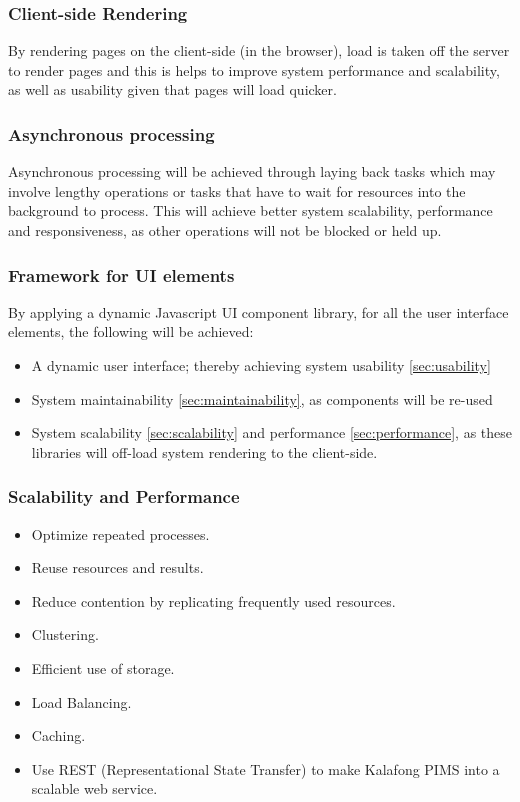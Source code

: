 \subsubsection{Client-side Rendering}
By rendering pages on the client-side (in the browser), load is taken off the server to render pages and this is helps to improve system performance and scalability, as well as usability given that pages will load quicker.


\subsubsection{Asynchronous processing}
Asynchronous processing will be achieved through laying back tasks which may involve lengthy operations or tasks that have to wait for resources into the background to process. This will achieve better system scalability, performance and responsiveness, as other operations will not be blocked or held up.


\subsubsection{Framework for UI elements}
By applying a dynamic Javascript UI component library, for all the user interface elements, the following will be achieved:
\begin{itemize}
		\item A dynamic user interface; thereby achieving system usability \ref{sec:usability}
		\item System maintainability  \ref{sec:maintainability}, as components will be re-used
		\item System scalability \ref{sec:scalability} and performance \ref{sec:performance}, as these libraries will off-load system rendering to the client-side.
\end{itemize}	

	
\subsubsection{Scalability and Performance}
	\begin{itemize}
		\item Optimize repeated processes.
		\item Reuse resources and results.
		\item Reduce contention by replicating frequently used resources.
		\item Clustering.
		\item Efficient use of storage.
		\item Load Balancing.
		\item Caching.
		\item Use REST (Representational State Transfer) to make Kalafong PIMS into a scalable web service.
	\end{itemize}	
